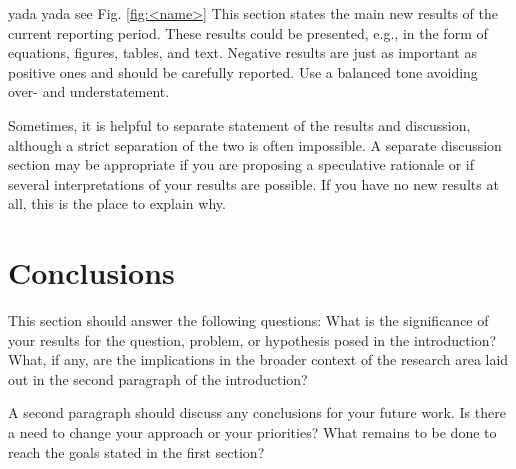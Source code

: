 \documentclass[11pt]{article}
\newcommand{\brian}[1]{{\color{orange} #1}}
\begin{document}
\brian{yada yada see Fig. \ref{fig:<name>}}
This section states the main new results of the current
reporting period. These results could be presented, e.g., in the form of
equations, figures, tables, and text. Negative results are just as
important as positive ones and should be carefully reported. Use a
balanced tone avoiding over- and understatement. 

Sometimes, it is helpful to separate statement of the results and
discussion, although a strict separation of the two is often
impossible. A separate discussion section may be appropriate if you are
proposing a speculative rationale or if several interpretations of your
results are possible. If you have no new results at all, this is the
place to explain why. 

\section{Conclusions}


This section should answer the following questions:
What is the significance of your results for the question, problem, or
hypothesis posed in the introduction? What, if any, are the
implications in the broader context of the research area laid out in the
second paragraph of the introduction? 

A second paragraph should discuss any conclusions for your future work. 
Is there a need to change your approach or your priorities? What remains
to be done to reach the goals stated in the first section? 

\printbibliography
\end{document}
